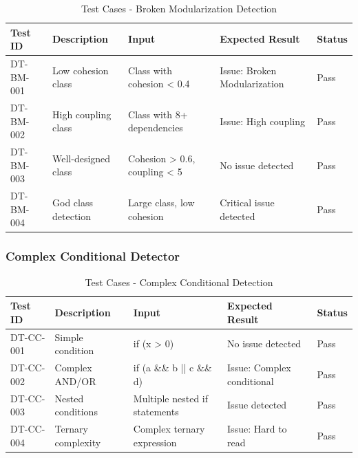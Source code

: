 \documentclass[12pt,a4paper]{article}
\begin{document}
    \begin{table}[H]
        \caption{Test Cases - Broken Modularization Detection}
        \begin{tabular}{|p{2cm}|p{4cm}|p{3cm}|p{3cm}|p{1.5cm}|}
            \hline
            \textbf{Test ID} & \textbf{Description} & \textbf{Input} & \textbf{Expected Result} & \textbf{Status} \\
            \hline
            DT-BM-001 & Low cohesion class & Class with cohesion < 0.4 & Issue: Broken Modularization & Pass \\
            \hline
            DT-BM-002 & High coupling class & Class with 8+ dependencies & Issue: High coupling & Pass \\
            \hline
            DT-BM-003 & Well-designed class & Cohesion > 0.6, coupling < 5 & No issue detected & Pass \\
            \hline
            DT-BM-004 & God class detection & Large class, low cohesion & Critical issue detected & Pass \\
            \hline
        \end{tabular}
    \end{table}

    \subsubsection{Complex Conditional Detector}

    \begin{table}[H]
        \caption{Test Cases - Complex Conditional Detection}
        \begin{tabular}{|p{2cm}|p{4cm}|p{3cm}|p{3cm}|p{1.5cm}|}
            \hline
            \textbf{Test ID} & \textbf{Description} & \textbf{Input} & \textbf{Expected Result} & \textbf{Status} \\
            \hline
            DT-CC-001 & Simple condition & if (x > 0) & No issue detected & Pass \\
            \hline
            DT-CC-002 & Complex AND/OR & if (a \&\& b || c \&\& d) & Issue: Complex conditional & Pass \\
            \hline
            DT-CC-003 & Nested conditions & Multiple nested if statements & Issue detected & Pass \\
            \hline
            DT-CC-004 & Ternary complexity & Complex ternary expression & Issue: Hard to read & Pass \\
            \hline
        \end{tabular}
    \end{table}
\end{document}
